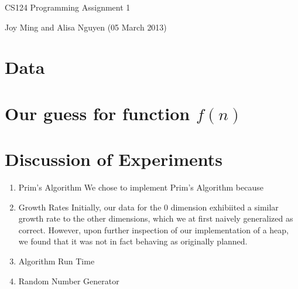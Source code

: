 \documentclass[11pt]{article}
\begin{document}
\begin{center}
\large
CS124 Programming Assignment 1
\end{center}
Joy Ming and Alisa Nguyen (05 March 2013)\\

\section{Data}
\section{Our guess for function $f(n)$}
\section{Discussion of Experiments}
\begin{enumerate}
\setcounter{enumi}{0}
\item Prim's Algorithm
\newline
\newline
We chose to implement Prim's Algorithm because 
\item Growth Rates
\newline
\newline
Initially, our data for the 0 dimension exhibiited a similar growth rate to the other dimensions, which we at first naively generalized as correct. However, upon further inspection of our implementation of a heap, we found that it was not in fact behaving as originally planned.
\item Algorithm Run Time
\item Random Number Generator
\end{enumerate}
\end{document}

